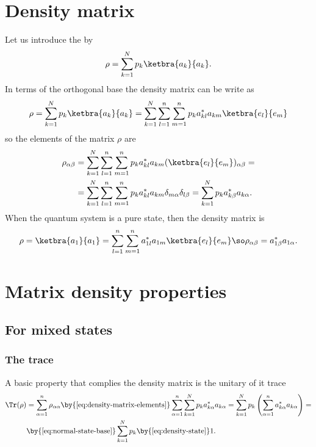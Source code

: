\section{Density matrix}
Let us introduce the  by
\begin{equation}
    \label{eq:density-matrix}
    \rho = \sum_{k=1}^N p_k\ketbra{a_k}{a_k}.
\end{equation}
In terms of the orthogonal base the density matrix can be write as
\begin{equation}
    \label{eq:density-matrix-basis}
    \rho = \sum_{k=1}^N p_k\ketbra{a_k}{a_k}=\sum_{k=1}^N\sum_{l=1}^n\sum_{m=1}^n p_{k} a_{kl}^* a_{km}\ketbra{e_l}{e_m}
\end{equation}
so the elements of the matrix $\rho$ are
\begin{equation}
\begin{split}
    \label{eq:density-matrix-elements}
    \rho_{\alpha\beta} &= \sum_{k=1}^N\sum_{l=1}^n\sum_{m=1}^n p_{k} a_{kl}^* a_{km}(\ketbra{e_l}{e_m})_{\alpha\beta} =\\
     &= \sum_{k=1}^N\sum_{l=1}^n\sum_{m=1}^n p_{k} a_{kl}^* a_{km}\delta_{m\alpha}\delta_{l\beta}= \sum_{k=1}^N p_{k} a_{k\beta}^* a_{k\alpha}.
\end{split}
\end{equation}
When the quantum system is a pure state, then the density matrix is
\begin{equation}
    \label{eq:pure-matrix}
    \rho = \ketbra{a_1}{a_1}=\sum_{l=1}^n\sum_{m=1}^n a_{1l}^* a_{1m}\ketbra{e_l}{e_m}\so \rho_{\alpha\beta}= a_{1\beta}^* a_{1\alpha}.
\end{equation}

\section{Matrix density properties}
\subsection{For mixed states}
\subsubsection{The trace}
A basic property that complies the density matrix is the unitary of it trace
\begin{equation*}
\begin{split}
    \label{eq:trace-density-matrix}
    \Tr(\rho) &= \sum_{\alpha=1}^n \rho_{\alpha\alpha} \by{\ref{eq:density-matrix-elements}} \sum_{\alpha=1}^n\sum_{k=1}^N p_{k} a_{k\alpha}^* a_{k\alpha}= \sum_{k=1}^N p_{k} \left(\sum_{\alpha=1}^n a_{k\alpha}^* a_{k\alpha}\right) =\\
    &\by{\ref{eq:normal-state-base}}\sum_{k=1}^N p_{k} \by{\ref{eq:density-state}} 1.
\end{split}
\end{equation*}

